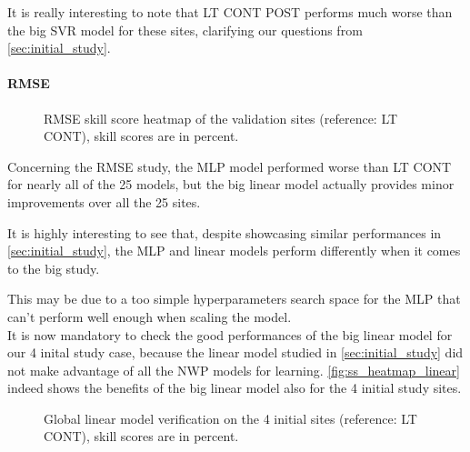 It is really interesting to note that LT CONT POST performs much worse than the big SVR model for these sites, clarifying our questions from \autoref{sec:initial_study}.

\paragraph{RMSE}
\begin{figure}[htb!]
    \centering
    
\caption{RMSE skill score heatmap of the validation sites (reference: LT CONT), skill scores are in percent.}
\end{figure}

Concerning the RMSE study, the MLP model performed worse than LT CONT for nearly all of the 25 models, but the big linear model actually provides minor improvements over all the 25 sites.

It is highly interesting to see that, despite showcasing similar performances in \autoref{sec:initial_study}, the MLP and linear models perform differently when it comes to the big study.

This may be due to a too simple hyperparameters search space for the MLP that can't perform well enough when scaling the model.\\

It is now mandatory to check the good performances of the big linear model for our 4 inital study case, because the linear model studied in \autoref{sec:initial_study} did not make advantage of all the NWP models for learning.
\autoref{fig:ss_heatmap_linear} indeed shows the benefits of the big linear model also for the 4 initial study sites.

\begin{figure}[htb!]
    \centering
    
\caption{Global linear model verification on the 4 initial sites (reference: LT CONT), skill scores are in percent.}
\label{fig:ss_heatmap_linear}
\end{figure}